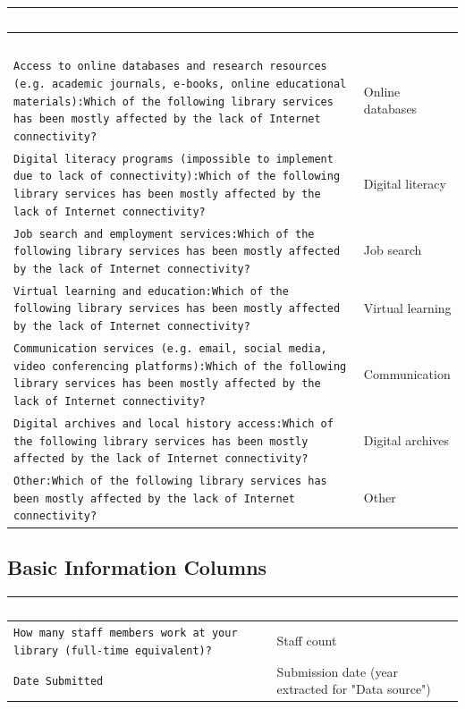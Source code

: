 \documentclass[11pt,a4paper]{article}
\begin{document}
\begin{longtable}{|p{12cm}|p{2cm}|}
\hline
\rowcolor{headerblue}\textcolor{white}{\textbf{Full Column Name}} & \textcolor{white}{\textbf{Short Label}} \\
\hline
\endfirsthead
\hline
\rowcolor{headerblue}\textcolor{white}{\textbf{Full Column Name}} & \textcolor{white}{\textbf{Short Label}} \\
\hline
\endhead
\texttt{Access to online databases and research resources (e.g. academic journals, e-books, online educational materials):Which of the following library services has been mostly affected by the lack of Internet connectivity?} & Online databases \\
\hline
\texttt{Digital literacy programs (impossible to implement due to lack of connectivity):Which of the following library services has been mostly affected by the lack of Internet connectivity?} & Digital literacy \\
\hline
\texttt{Job search and employment services:Which of the following library services has been mostly affected by the lack of Internet connectivity?} & Job search \\
\hline
\texttt{Virtual learning and education:Which of the following library services has been mostly affected by the lack of Internet connectivity?} & Virtual learning \\
\hline
\texttt{Communication services (e.g. email, social media, video conferencing platforms):Which of the following library services has been mostly affected by the lack of Internet connectivity?} & Communication \\
\hline
\texttt{Digital archives and local history access:Which of the following library services has been mostly affected by the lack of Internet connectivity?} & Digital archives \\
\hline
\texttt{Other:Which of the following library services has been mostly affected by the lack of Internet connectivity?} & Other \\
\hline
\end{longtable}

\subsection{Basic Information Columns}

\begin{longtable}{|p{9cm}|p{5cm}|}
\hline
\rowcolor{headerblue}\textcolor{white}{\textbf{Column}} & \textcolor{white}{\textbf{Description}} \\
\hline
\texttt{How many staff members work at your library (full-time equivalent)?} & Staff count \\
\hline
\texttt{Date Submitted} & Submission date (year extracted for "Data source") \\
\hline
\end{longtable}
\end{document}
